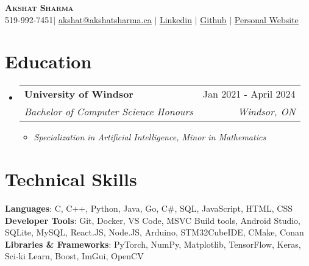 \documentclass[letterpaper,11pt]{article}
\makeatletter
\newcommand{\resumeItem}[1]{
  \item\small{
    {#1 \vspace{-2pt}}
  }
}
\newcommand{\resumeSubheading}[4]{
  \vspace{-2pt}\item
    \begin{tabular*}{0.97\textwidth}[t]{l@{\extracolsep{\fill}}r}
      \textbf{#1} & #2 \\
      \textit{\small#3} & \textit{\small #4} \\
    \end{tabular*}\vspace{-7pt}
}
\newcommand{\resumeSubHeadingListStart}{\begin{itemize}[leftmargin=0.15in, label={}]}
\newcommand{\resumeSubHeadingListEnd}{\end{itemize}}
\newcommand{\resumeItemListStart}{\begin{itemize}}
\newcommand{\resumeItemListEnd}{\end{itemize}\vspace{-5pt}}
\makeatother
\begin{document}

\begin{center}
    \textbf{\Huge \scshape Akshat Sharma} \\ \vspace{1pt}
    \small 519-992-7451$|$ \href{mailto:akshat@akshatsharma.ca}{\underline{akshat@akshatsharma.ca}} $|$ 
    \href{https://www.linkedin.com/in/akshat8d/}{\underline{Linkedin}} $|$
    \href{https://github.com/Cyoger}{\underline{Github}} $|$
    \href{https://akshatsharma.ca}{\underline{Personal Website}}
\end{center}


\section{Education}
  \resumeSubHeadingListStart
    \resumeSubheading
      {University of Windsor}{Jan 2021 - April 2024}
      {Bachelor of Computer Science Honours}{Windsor, ON}
    \resumeItemListStart
      \resumeItem{\textit{Specialization in Artificial Intelligence, Minor in Mathematics}}
    \resumeItemListEnd
    
  \resumeSubHeadingListEnd

%
\section{Technical Skills}
 \begin{itemize}[leftmargin=0.15in, label={}]
    \small{\item{
     \textbf{Languages}{: C, C++, Python, Java, Go, C\#, SQL, JavaScript, HTML, CSS} \\
     \textbf{Developer Tools}{: Git, Docker, VS Code, MSVC Build tools, Android Studio, SQLite, MySQL, React.JS, Node.JS, Arduino, STM32CubeIDE, CMake, Conan} \\
     \textbf{Libraries \& Frameworks}{: PyTorch, NumPy, Matplotlib, TensorFlow, Keras, Sci-ki Learn, Boost, ImGui, OpenCV} \\
    }}
 \end{itemize}
\end{document}
